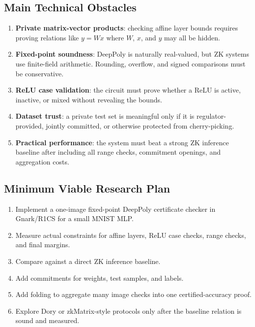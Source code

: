 \documentclass[11pt,a4paper]{article}
\begin{document}
\subsection{Main Technical Obstacles}

\begin{enumerate}
    \item \textbf{Private matrix-vector products}: checking affine layer bounds requires proving relations like $y = Wx$ where $W$, $x$, and $y$ may all be hidden.
    \item \textbf{Fixed-point soundness}: DeepPoly is naturally real-valued, but ZK systems use finite-field arithmetic. Rounding, overflow, and signed comparisons must be conservative.
    \item \textbf{ReLU case validation}: the circuit must prove whether a ReLU is active, inactive, or mixed without revealing the bounds.
    \item \textbf{Dataset trust}: a private test set is meaningful only if it is regulator-provided, jointly committed, or otherwise protected from cherry-picking.
    \item \textbf{Practical performance}: the system must beat a strong ZK inference baseline after including all range checks, commitment openings, and aggregation costs.
\end{enumerate}

\subsection{Minimum Viable Research Plan}

\begin{enumerate}
    \item Implement a one-image fixed-point DeepPoly certificate checker in Gnark/R1CS for a small MNIST MLP.
    \item Measure actual constraints for affine layers, ReLU case checks, range checks, and final margins.
    \item Compare against a direct ZK inference baseline.
    \item Add commitments for weights, test samples, and labels.
    \item Add folding to aggregate many image checks into one certified-accuracy proof.
    \item Explore Dory or zkMatrix-style protocols only after the baseline relation is sound and measured.
\end{enumerate}

\newpage
\end{document}
